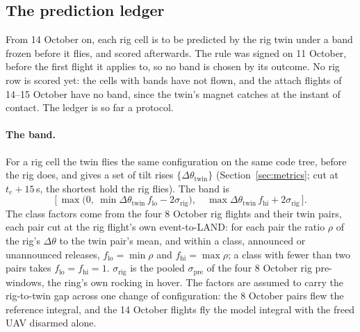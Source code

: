 
\subsection{The prediction ledger}
\label{sec:ledger}

From 14 October on, each rig cell is to be predicted by the rig twin under a band frozen before it flies, and scored
afterwards. The rule was signed on 11 October, before the first flight it applies to, so no band is chosen by its
outcome. No rig row is scored yet: the cells with bands have not flown, and the attach flights of 14--15 October have no
band, since the twin's magnet catches at the instant of contact. The ledger is so far a protocol.

\paragraph{The band.} For a rig cell the twin flies the same configuration on the same code tree, before the
rig does, and gives a set of tilt rises $\{\Delta\theta_{\mathrm{twin}}\}$ (Section~\ref{sec:metrics}; cut at
$t_e+15$\,s, the shortest hold the rig flies). The band is
\begin{equation}
  \Big[\,\max\big(0,\ \min\Delta\theta_{\mathrm{twin}}\,f_{\mathrm{lo}}-2\sigma_{\mathrm{rig}}\big),\quad
  \max\Delta\theta_{\mathrm{twin}}\,f_{\mathrm{hi}}+2\sigma_{\mathrm{rig}}\,\Big].
  \label{eq:band}
\end{equation}
The class factors come from the four 8 October rig flights and their twin pairs, each pair cut at the rig
flight's own event-to-LAND: for each pair the ratio $\rho$ of the rig's $\Delta\theta$ to the twin pair's
mean, and within a class, announced or unannounced releases, $f_{\mathrm{lo}}=\min\rho$ and
$f_{\mathrm{hi}}=\max\rho$; a class with fewer than two pairs takes $f_{\mathrm{lo}}=f_{\mathrm{hi}}=1$.
$\sigma_{\mathrm{rig}}$ is the pooled $\sigma_{\mathrm{pre}}$ of the four 8 October rig pre-windows, the
ring's own rocking in hover. The factors are assumed to carry the rig-to-twin gap across one change of
configuration: the 8 October pairs flew the reference integral, and the 14 October flights fly the model
integral with the freed UAV disarmed alone.

